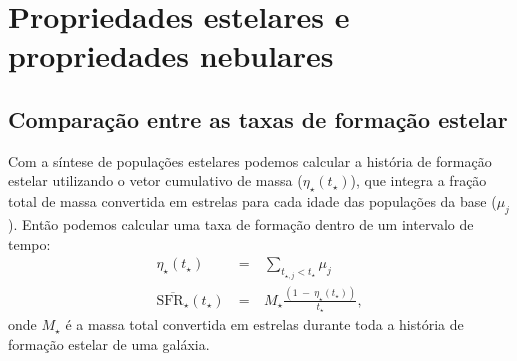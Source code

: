 


\chapter{Propriedades estelares e propriedades nebulares}
\label{sec:synvsneb}

\section{Comparação entre as taxas de formação estelar}
\label{sec:synvsneb:SFR}

Com a síntese de populações estelares podemos calcular a história de formação estelar utilizando o
vetor cumulativo de massa ($\eta_\star(t_\star)$), que integra a fração total de massa convertida em
estrelas para cada idade das populações da base ($\mu_j$). Então podemos calcular uma taxa de
formação dentro de um intervalo de tempo:
\begin{eqnarray}
	\eta_\star(t_\star)\ &=&\ \sum\limits_{t_{\star,j} < t_\star} \mu_j \\
	\overline{\mathrm{SFR}_\star}(t_\star)\ &=&\ M_\star \frac{(1\ -\ \eta_\star(t_\star))}{t_\star},
\end{eqnarray}
\noindent onde $M_\star$ é a massa total convertida em estrelas durante toda a história de
formação estelar de uma galáxia. 

